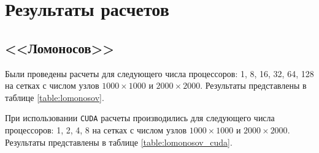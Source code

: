 \section{Результаты расчетов}

\subsection{<<Ломоносов>>}

Были проведены расчеты для следующего числа процессоров: 1, 8, 16, 32, 64, 128 на сетках с числом узлов $1000 \times 1000$ и $2000 \times 2000$. Результаты представлены в таблице \ref{table:lomonosov}.

\begin{table}[H]
  \centering
  
  \caption{Таблица с результатами расчетов на ПВС <<Ломоносов>> с \texttt{MPI}.}
  \label{table:lomonosov}
\end{table}

При использовании \texttt{CUDA} расчеты производились для следующего числа процессоров: 1, 2, 4, 8 на сетках с числом узлов $1000 \times 1000$ и $2000 \times 2000$. Результаты представлены в таблице \ref{table:lomonosov_cuda}.

